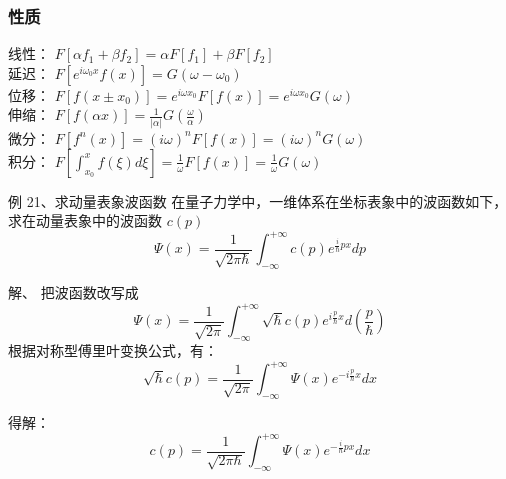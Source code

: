 \begin{frame}
	\frametitle{性质 }
    线性： $F[\alpha  f_1 +\beta f_2]=\alpha  F[f_1]+ \beta F[f_2]$ \\ \vspace{0.3cm}
    延迟： $F[e^{i\omega_0x} f(x)] = G(\omega-\omega_0) $ \\ \vspace{0.3cm}
    位移： $F[ f(x\pm x_0)] = e^{i\omega x_0 } F[f(x)]=e^{i\omega x_0 }G(\omega) $ \\ \vspace{0.3cm}
    伸缩： $F[ f(\alpha  x)] = \frac{1}{|\alpha |}G(\frac{\omega}{\alpha }) $ \\ \vspace{0.3cm}
    微分： $F[ f^{n} (x)] = (i\omega ) ^n F[f(x)]= (i\omega )^n G(\omega) $ \\ \vspace{0.3cm}
    积分： $F[ \int_{x_0}^{x}f (\xi) d\xi ] = \frac{1}{\omega}  F[f(x)]=\frac{1}{\omega} G(\omega) $ \\ \vspace{0.3cm}
\end{frame}

\begin{frame}
	\begin{exampleblock} {例 21、求动量表象波函数}
	{在量子力学中，一维体系在坐标表象中的波函数如下，求在动量表象中的波函数 $c(p)$}
		\begin{equation*}
			\Psi(x)=\frac{1}{\sqrt{2\pi \hbar}}  \int_{-\infty}^{+\infty} c(p) e^{\frac{i}{\hbar} px} dp 
		\end{equation*}   	
	\end{exampleblock}
	\alert{解、} 把波函数改写成  \\	
	\begin{equation*}
		\Psi(x)= \frac{1}{\sqrt{2\pi }} \int_{-\infty}^{+\infty} \sqrt{\hbar} c(p) e^{i\frac{p}{\hbar} x} d(\frac{p}{\hbar})  
	\end{equation*}     
	根据对称型傅里叶变换公式，有： 
	\begin{equation*}
		\sqrt{\hbar} c(p) = \frac{1}{\sqrt{2\pi }} \int_{-\infty}^{+\infty} \Psi(x) e^{-i\frac{p}{\hbar} x} dx
	\end{equation*}   
\end{frame}

\begin{frame}
	得解：
	\begin{equation*}
		c(p) = \frac{1}{\sqrt{2\pi \hbar }} \int_{-\infty}^{+\infty} \Psi(x) e^{-\frac{i}{\hbar} px} dx
	\end{equation*}   
\end{frame}

